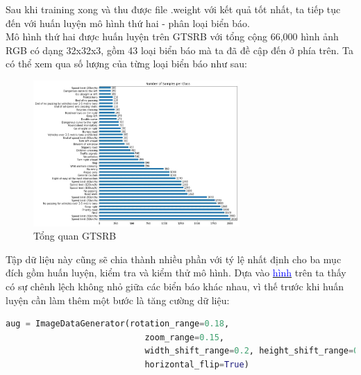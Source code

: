 \noindent Sau khi training xong và thu được file .weight với kết quả tốt nhất, ta tiếp tục đến với huấn luyện mô hình thứ hai - phân loại biển báo. \\
\newline 
Mô hình thứ hai được huấn luyện trên GTSRB với tổng cộng 66,000 hình ảnh RGB có dạng 32x32x3, gồm 43 loại biển báo mà ta đã đề cập đến ở phía trên. Ta có thể xem qua số lượng của từng loại biển báo như sau:
\newpage
\begin{figure}[htbp]
    \centering
    \includegraphics[width = 0.7\textwidth]{images/2c-sign/overall.jpg}
    \caption{Tổng quan GTSRB}
    \label{fig:overall}
\end{figure}

\noindent Tập dữ liệu này cũng sẽ chia thành nhiều phần với tý lệ nhất định cho ba mục đích gồm huấn luyện, kiểm tra và kiểm thử mô hình. Dựa vào \hyperlink{fig:overall}{\textcolor{blue}{hình}} trên ta thấy có sự chênh lệch không nhỏ giữa các biển báo khác nhau, vì thế trước khi huấn luyện cần làm thêm một bước là tăng cường dữ liệu:
\begin{lstlisting}[language = Python]
aug = ImageDataGenerator(rotation_range=0.18, 
                            zoom_range=0.15, 
                            width_shift_range=0.2, height_shift_range=0.2, 
                            horizontal_flip=True)
\end{lstlisting}

